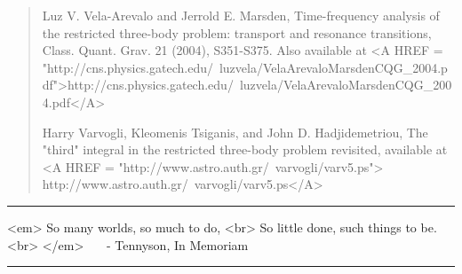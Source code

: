 \begin{quote}
Luz V. Vela-Arevalo and Jerrold E. Marsden,
Time-frequency analysis of the restricted three-body problem:
transport and resonance transitions, Class. Quant. Grav. 21 (2004), 
S351-S375.  Also available at
<A HREF = "http://cns.physics.gatech.edu/~luzvela/VelaArevaloMarsdenCQG_2004.pdf">http://cns.physics.gatech.edu/~luzvela/VelaArevaloMarsdenCQG_2004.pdf</A> 

Harry Varvogli, Kleomenis Tsiganis, and John D. Hadjidemetriou,
The "third" integral in the restricted three-body problem 
revisited, available at
<A HREF = "http://www.astro.auth.gr/~varvogli/varv5.ps">
http://www.astro.auth.gr/~varvogli/varv5.ps</A>

\end{quote} 









\par\noindent\rule{\textwidth}{0.4pt}
<em>     So many worlds, so much to do, <br>
     So little done, such things to be. <br>
</em>
\  \  \          - Tennyson, In Memoriam
   
\par\noindent\rule{\textwidth}{0.4pt}

